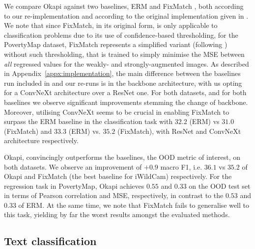 We compare Okapi against two baselines, \ac{ERM} and FixMatch \citep{sohn2020fixmatch},
both according to our re-implementation and according to the original implementation given in
\citet{SagWeiLeeGaoetal22}.
%
We note that since FixMatch, in its original form, is only applicable to classification problems
due to its use of confidence-based thresholding, for the PovertyMap dataset, FixMatch represents a
simplified variant (following \citep{SagWeiLeeGaoetal22}) without such thresholding, that is
trained to simply minimise the MSE between \emph{all} regressed values for the weakly- and
strongly-augmented images.
%
As described in Appendix~\ref{appx:implementation}, the main difference between the baselines run
included in \citet{SagWeiLeeGaoetal22} and our re-runs is in the backbone architecture, with us
opting for a ConvNeXt \citep{liu2022convnet} architecture over a ResNet one.
%
For both datasets, and for both baselines we observe significant improvements stemming the change
of backbone.
%
%
Moreover, utilising ConvNeXt seems to be crucial in enabling FixMatch to surpass the \ac{ERM} baseline
in the classification task with $32.2$ (ERM) vs $31.0$ (FixMatch) and $33.3$ (ERM) vs. $35.2$
(FixMatch), with ResNet and ConvNeXt architecture respectively. 
% 

Okapi, convincingly outperforms the baselines, \wrt{} the \ac{OOD} metric of interest, on both
datasets. 
%
We observe an improvement of $+0.9$ macro F1, i.e. $36.1$ vs $35.2$ of Okapi and FixMatch (the best
baseline for iWildCam) respectively. For the regression task in PovertyMap, Okapi achieves $0.55$
and $0.33$ on the \ac{OOD} test set in terms of Pearson correlation and MSE, respectively, in contrast
to the $0.53$ and $0.33$ of \ac{ERM}.
%
At the same time, we note that FixMatch fails to generalise well to this task, yielding by far the
worst results amongst the evaluated methods.

\subsection{Text classification}


